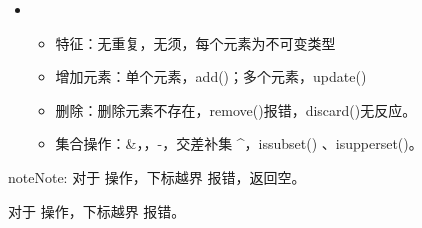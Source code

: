 \documentclass[letterpaper,10pt,english]{sphinxmanual}
\begin{document}
\begin{itemize}
\item {} 
\begin{itemize}
\item {} 
特征：无重复，无须，每个元素为不可变类型

\item {} 
增加元素：单个元素，add()；多个元素，update()

\item {} 
删除：删除元素不存在，remove()报错，discard()无反应。

\item {} 
集合操作：\&，\textbar{}，-，交差补集 \textasciicircum{}，issubset() 、isupperset()。

\end{itemize}

%
\begin{sphinxVerbatim}[commandchars=\\\{\},numbers=left,firstnumber=1,stepnumber=1]
     
 
\end{sphinxVerbatim}

\end{itemize}

\begin{sphinxadmonition}{note}{Note:}
对于  操作，下标越界  报错，返回空。

对于  操作，下标越界  报错。
\end{sphinxadmonition}
\end{document}
